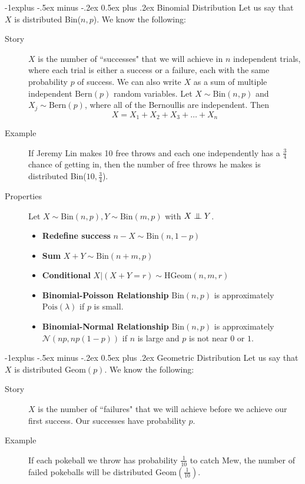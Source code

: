 \documentclass[10pt,landscape]{article}
\makeatletter
\newcommand\independent{\protect\mathpalette{\protect\independenT}{\perp}}
\def\independenT#1#2{\mathrel{\setbox0\hbox{$#1#2$}%
    \copy0\kern-\wd0\mkern4mu\box0}}
\newcommand{\N}{\mathcal{N}}
\newcommand{\Bern}{\textrm{Bern}}
\newcommand{\Bin}{\textrm{Bin}}
\newcommand{\Pois}{\textrm{Pois}}
\newcommand{\Geom}{\textrm{Geom}}
\newcommand{\HGeom}{\textrm{HGeom}}
\renewcommand{\subsection}{\@startsection{subsection}{2}{0mm}%
                                {-1explus -.5ex minus -.2ex}%
                                {0.5ex plus .2ex}%
                                {\normalfont\normalsize\bfseries}}
\makeatother
\begin{document}
\begin{multicols*}{3}
\subsection{Binomial Distribution} 
Let us say that $X$ is distributed \Bin($n,p$). We know the following:
\begin{description}
    \item[Story] $X$ is the number of ``successes" that we will achieve in $n$ independent trials, where each trial is either a success or a failure, each with the same probability $p$ of success. We can also write $X$ as a sum of multiple independent $\Bern(p)$ random variables. Let $X \sim \Bin(n, p)$ and $X_j \sim \Bern(p)$, where all of the Bernoullis are independent. Then
        \[X = X_1 + X_2 + X_3 + \dots + X_n\]
    \item[Example] If Jeremy Lin makes 10 free throws and each one independently has a $\frac{3}{4}$ chance of getting in, then the number of free throws he makes is distributed  \Bin($10,\frac{3}{4}$).
\item[Properties] Let $X \sim \Bin(n,p), Y \sim \Bin(m,p)$ with $X \independent Y$.
\begin{itemize}
\item \textbf{Redefine success} $n-X \sim \Bin(n,1-p)$
\item \textbf{Sum} $X+Y \sim \Bin(n+m,p)$
\item \textbf{Conditional} $X|(X+Y=r) \sim \HGeom(n,m,r)$
 \item \textbf{Binomial-Poisson Relationship} $\Bin(n, p)$ is approximately  $\Pois(\lambda)$ if $p$ is small.
   \item \textbf{Binomial-Normal Relationship} $\Bin(n, p)$ is approximately $\N(np,np(1-p))$ if $n$ is large and $p$ is not near $0$ or $1$.
  \end{itemize}
\end{description}

\subsection{Geometric Distribution} Let us say that $X$ is distributed $\Geom(p)$. We know the following:
\begin{description}
    \item[Story] $X$ is the number of ``failures" that we will achieve before we achieve our first success. Our successes have probability $p$.
    \item[Example] If each pokeball we throw has probability  $\frac{1}{10}$ to catch Mew, the number of failed pokeballs will be distributed $\Geom(\frac{1}{10})$.
\end{description}


\end{multicols*}
\end{document}
